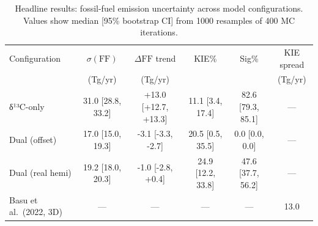 \begin{table}[ht]
\centering
\caption{Headline results: fossil-fuel emission uncertainty across model configurations. 
Values show median [95\% bootstrap CI] from 1000 resamples of 400 MC iterations.}
\label{tab:headline}
\begin{tabular}{lccccc}
\toprule
Configuration & $\sigma(\mathrm{FF})$ & $\Delta\mathrm{FF}$ trend & KIE\% & Sig\% & KIE spread \\
 & (Tg/yr) & (Tg/yr) & & & (Tg/yr) \\
\midrule
  δ¹³C-only & 31.0 [28.8, 33.2] & +13.0 [+12.7, +13.3] & 11.1 [3.4, 17.4] & 82.6 [79.3, 85.1] & — \\
  Dual (offset) & 17.0 [15.0, 19.3] & -3.1 [-3.3, -2.7] & 20.5 [0.5, 35.5] & 0.0 [0.0, 0.0] & — \\
  Dual (real hemi) & 19.2 [18.0, 20.3] & -1.0 [-2.8, +0.4] & 24.9 [12.2, 33.8] & 47.6 [37.7, 56.2] & — \\
  \midrule
  Basu et al.\ (2022, 3D) & --- & --- & --- & --- & 13.0 \\
\bottomrule
\end{tabular}
\end{table}
